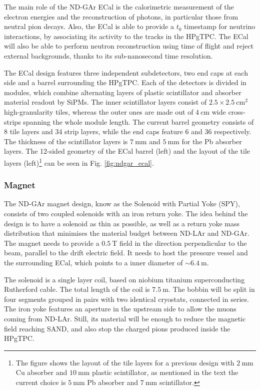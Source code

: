 The main role of the ND-GAr ECal is the calorimetric measurement of the electron energies and the reconstruction of photons, in particular those from neutral pion decays. Also, the ECal is able to provide a $t_{0}$ timestamp for neutrino interactions, by associating its activity to the tracks in the HPgTPC. The ECal will also be able to perform neutron reconstruction using time of flight and reject external backgrounds, thanks to its sub-nanosecond time resolution.

The ECal design features three independent subdetectors, two end caps at each side and a barrel surrounding the HPgTPC. Each of the detectors is divided in modules, which combine alternating layers of plastic scintillator and absorber material readout by SiPMs. The inner scintillator layers consist of $2.5\times2.5~\mathrm{cm}^{2}$ high-granularity tiles, whereas the outer ones are made out of $4~\mathrm{cm}$ wide cross-strips spanning the whole module length. The current barrel geometry consists of 8 tile layers and 34 strip layers, while the end caps feature 6 and 36 respectively. The thickness of the scintillator layers is $7~\mathrm{mm}$ and $5~\mathrm{mm}$ for the Pb absorber layers. The 12-sided geometry of the ECal barrel (left) and the layout of the tile layers (left)\footnote{The figure shows the layout of the tile layers for a previous design with $2~\mathrm{mm}$ Cu absorber and $10~\mathrm{mm}$ plastic scintillator, as mentioned in the text the current choice is $5~\mathrm{mm}$ Pb absorber and $7~\mathrm{mm}$ scintillator.} can be seen in Fig. \ref{fig:ndgar_ecal}.

\subsubsection{Magnet}

The ND-GAr magnet design, know as the Solenoid with Partial Yoke (SPY), consists of two coupled solenoids with an iron return yoke. The idea behind the design is to have a solenoid as thin as possible, as well as a return yoke mass distribution that minimises the material budget between ND-LAr and ND-GAr. The magnet needs to provide a $0.5~\mathrm{T}$ field in the direction perpendicular to the beam, parallel to the drift electric field. It needs to host the pressure vessel and the surrounding ECal, which points to a inner diameter of $\sim6.4~\mathrm{m}$.

The solenoid is a single layer coil, based on niobium titanium superconducting Rutherford cable. The total length of the coil is $7.5~\mathrm{m}$. The bobbin will be split in four segments grouped in pairs with two identical cryostats, connected in series. The iron yoke features an aperture in the upstream side to allow the muons coming from ND-LAr. Still, its material will be enough to reduce the magnetic field reaching SAND, and also stop the charged pions produced inside the HPgTPC.

